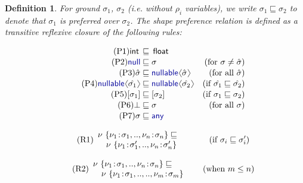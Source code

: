 \documentclass[10pt]{sigplanconf}
\newcommand{\langl}{\begin{picture}(4.5,7)
\put(1.1,2.5){\rotatebox{60}{\line(1,0){5.5}}}
\put(1.1,2.5){\rotatebox{300}{\line(1,0){5.5}}}
\end{picture}}
\newcommand{\rangl}{\begin{picture}(4.5,7)
\put(.9,2.5){\rotatebox{120}{\line(1,0){5.5}}}
\put(.9,2.5){\rotatebox{240}{\line(1,0){5.5}}}
\end{picture}}
\newcommand{\kvd}[1]{\textnormal{\textcolor{kvdclr}{\sffamily #1}}}
\newcommand{\ident}[1]{\textnormal{\sffamily #1}}
\newtheorem{definition}{Definition}
\begin{document}
\begin{definition}
For ground $\sigma_1$, $\sigma_2$ (i.e. without $\rho_i$ variables), we write $\sigma_1 \sqsubseteq \sigma_2$ to denote that $\sigma_1$ is preferred over $\sigma_2$. 
The shape preference relation is defined as a transitive reflexive closure of the following rules:

\noindent
\begin{align}
  \label{eq:sub-prim}\tag{P1}
  \ident{int}\,&\sqsubseteq\,\ident{float}&\\[-0.2em]
  \label{eq:sub-null}\tag{P2}
  \kvd{null} &\sqsubseteq \sigma  &(\textnormal{for}~\sigma \neq \hat{\sigma})  \\[-0.2em]
  \label{eq:sub-opt}\tag{P3}
  \hat{\sigma} &\sqsubseteq \kvd{nullable}\langl\hat{\sigma}\rangl  &(\textnormal{for all}~\hat{\sigma})\\[-0.2em]
  \label{eq:sub-opt-cov}\tag{P4}
  \kvd{nullable}\langl\hat{\sigma_1}\rangl &\sqsubseteq 
    \kvd{nullable}\langl\hat{\sigma_2}\rangl  &(\textnormal{if}~\hat{\sigma_1} \sqsubseteq \hat{\sigma_2})\\[-0.2em]
  \label{eq:sub-col}\tag{P5}
  [\sigma_1] &\sqsubseteq [\sigma_2]  &(\textnormal{if}~\sigma_1 \sqsubseteq \sigma_2) \\[-0.2em]
  \label{eq:sub-bot}\tag{P6}
  \bot &\sqsubseteq \sigma  &(\textnormal{for all}~\sigma)\\[-0.2em]
  \label{eq:sub-var-top}\tag{P7}
  \sigma &\sqsubseteq \kvd{any}
\end{align}
\vspace{-2em}

\noindent
\begin{align}
\label{eq:sub-record1}\tag{R1}
\begin{array}{l}
 \nu~\{ \nu_1\!:\!\sigma_1, .., \nu_n\!:\!\sigma_n \} \sqsubseteq \\
 \quad\nu~\{ \nu_1\!:\!\sigma_1', .., \nu_n\!:\!\sigma_n' \}
\end{array} \qquad ~~~~(\textnormal{if}~\sigma_i \sqsubseteq \sigma_i')
\end{align}

\vspace{-1.5em}

\begin{align}
\label{eq:sub-record2}\tag{R2}
\begin{array}{l}
 \nu~\{ \nu_1\!:\!\sigma_1, .., \nu_n\!:\!\sigma_n \} \sqsubseteq \\
 \quad\nu~\{ \nu_1\!:\!\sigma_1, .., .., \nu_m\!:\!\sigma_m \}
\end{array} \quad~~\, (\textnormal{when}~m \leq n)
\end{align}

\end{definition}
\end{document}
